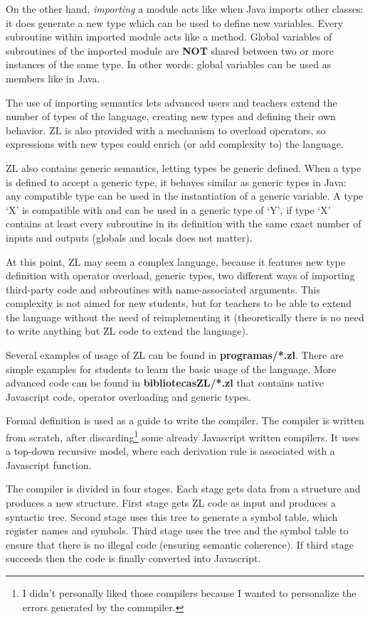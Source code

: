 \documentclass{report}
\begin{document}
	On the other hand, \textit{importing} a module acts like when Java imports other classes: it does generate a new type which can be used to define new variables. Every subroutine within imported module acts like a method. Global variables of subroutines of the imported module are \textbf{NOT} shared between two or more instances of the same type. In other words: global variables can be used as members like in Java. 
	
	The use of importing semantics lets advanced users and teachers extend the number of types of the language, creating new types and defining their own behavior. ZL is also provided with a mechanism to overload operators, so expressions with new types could enrich (or add complexity to) the language. 
	
	ZL also contains generic semantics, letting types be generic defined. When a type is defined to accept a generic type, it behaves similar as generic types in Java: any compatible type can be used in the instantiation of a generic variable. A type `X' is compatible with and can be used in a generic type of `Y', if type `X' contains at least every subroutine in its definition with the same exact number of inputs and outputs (globals and locals does not matter).  
	
	At this point, ZL may seem a complex language, because it features new type definition with operator overload, generic types, two different ways of importing third-party code and subroutines with name-associated arguments. This complexity is not aimed for new students, but for teachers to be able to extend the language without the need of reimplementing it (theoretically there is no need to write anything but ZL code to extend the language). 

	Several examples of usage of ZL can be found in \textbf{programas/*.zl}. There are simple examples for students to learn the basic usage of the language. More advanced code can be found in \textbf{bibliotecasZL/*.zl} that contains native Javascript code, operator overloading and generic types. 
	
	Formal definition is used as a guide to write the compiler. The compiler is written from scratch, after discarding\footnote{I didn't personally liked those compilers because I wanted to personalize the errors generated by the commpiler.} some already Javascript written compilers. It uses a top-down recursive model, where each derivation rule is associated with a Javascript function. 
	
	The compiler is divided in four stages. Each stage gets data from a structure and produces a new structure. First stage gets ZL code as input and produces a syntactic tree. Second stage uses this tree to generate a symbol table, which register names and symbols. Third stage uses the tree and the symbol table to ensure that there is no illegal code (ensuring semantic coherence). If third stage succeeds then the code is finally converted into Javascript.
	
\end{document}
